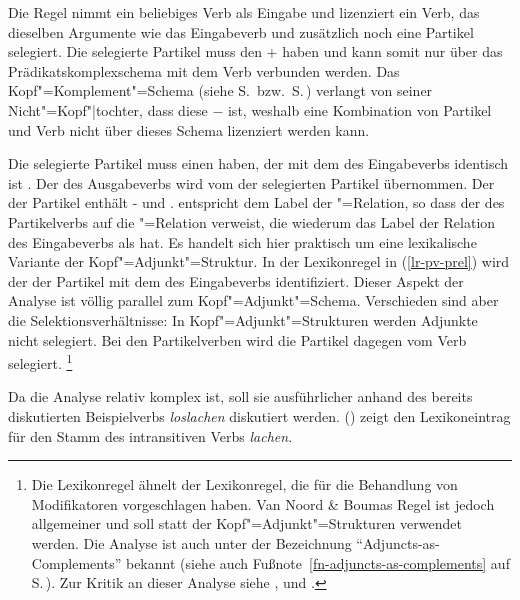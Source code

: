Die Regel nimmt ein beliebiges Verb als Eingabe und lizenziert ein Verb,
das dieselben Argumente wie das Eingabeverb und zusätzlich noch eine Partikel selegiert.
Die selegierte Partikel muss den \lexw + haben und kann somit nur über
das Prädikatskomplexschema mit dem Verb verbunden werden. Das Kopf"=Komplement"=Schema
(siehe S.\,\pageref{schema-bin} bzw.\ S.\,\pageref{schema-bin-mark-final}) verlangt von seiner
Nicht"=Kopf"|tochter, dass diese \lex$-$ ist, weshalb eine Kombination von Partikel und Verb nicht
über dieses Schema lizenziert werden kann.

Die selegierte Partikel muss einen \modw haben, der mit dem \synsemw des Eingabeverbs
identisch ist . Der \contw des Ausgabeverbs wird vom \contw der selegierten
Partikel  übernommen. Der \contw der Partikel enthält \ltop- und \indw. \ltop entspricht
dem Label der "=Relation, so dass der \ltopw des Partikelverbs auf die
"=Relation verweist, die wiederum das Label der Relation des Eingabeverbs als \argone hat.
Es handelt sich hier praktisch um eine lexikalische Variante der Kopf"=Adjunkt"=Struktur.
In der Lexikonregel in (\ref{lr-pv-prel}) wird der \modw der Partikel mit dem
\synsemw des Eingabeverbs identifiziert. Dieser Aspekt der Analyse ist völlig parallel zum Kopf"=Adjunkt"=Schema. Verschieden
sind aber die Selektionsverhältnisse: In Kopf"=Adjunkt"=Strukturen werden Adjunkte nicht selegiert.
Bei den Partikelverben wird die Partikel dagegen vom Verb selegiert.%
\footnote{%
  Die Lexikonregel ähnelt der Lexikonregel, die \citet{NB94} für die Behandlung von Modifikatoren
  vorgeschlagen haben. Van Noord \& Boumas Regel ist jedoch allgemeiner und soll statt
  der Kopf"=Adjunkt"=Strukturen verwendet werden. Die Analyse ist auch unter der Bezeichnung
  "`Adjuncts-as-Complements"' bekannt (siehe auch Fußnote~\ref{fn-adjuncts-as-complements} auf S.\,\pageref{fn-adjuncts-as-complements}). Zur Kritik an dieser Analyse siehe
  ,  und .%
}
\largerpage[1.5]

Da die Analyse relativ komplex ist, soll sie ausführlicher anhand des bereits diskutierten
Beispielverbs \emph{loslachen} diskutiert werden. () zeigt den Lexikoneintrag
für den Stamm des intransitiven Verbs \emph{lachen}.

